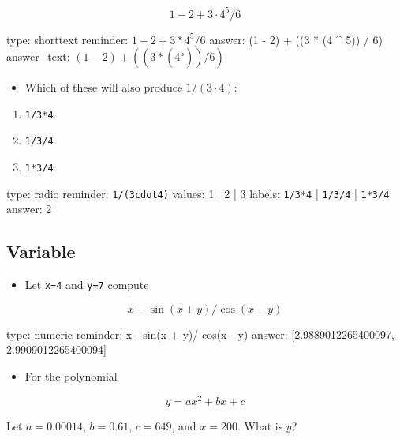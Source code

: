 \documentclass[12pt]{article}
\begin{document}
\[
1 - 2 + 3 \cdot 4 ^ 5 / 6
\]

\begin{answer}
type: shorttext
reminder: \( 1 - 2 + 3 * 4 ^ 5 / 6 \)
answer: (1 - 2) + ((3 * (4 ^ 5)) / 6)
answer_text: \( (1 - 2) + ((3 * (4 ^ 5)) / 6) \) 
\end{answer}

\begin{itemize}
\itemsep1pt\parskip0pt
\item
  Which of these will also produce $1/(3\cdot4)$:
\end{itemize}

\begin{enumerate}
\def\labelenumi{\arabic{enumi})}
\itemsep1pt\parskip0pt
\item
  \texttt{1/3*4}
\item
  \texttt{1/3/4}
\item
  \texttt{1*3/4}
\end{enumerate}

\begin{answer}
type: radio
reminder: \verb+1/(3cdot4)+
values: 1 | 2 | 3
labels: \verb+1/3*4+ | \verb+1/3/4+ | \verb+1*3/4+
answer: 2
\end{answer}

\subsection{Variable}

\begin{itemize}
\itemsep1pt\parskip0pt
\item
  Let \texttt{x=4} and \texttt{y=7} compute
\end{itemize}

\[
x - \sin(x + y)/\cos(x - y)
\]

\begin{answer}
    type: numeric
    reminder: x - sin(x + y)/ cos(x - y)
    answer: [2.9889012265400097, 2.9909012265400094]

\end{answer}

\begin{itemize}
\itemsep1pt\parskip0pt
\item
  For the polynomial
\end{itemize}

\[
y = ax^2 + bx + c
\]

Let $a=0.00014$, $b=0.61$, $c=649$, and $x=200$. What is $y$?
\end{document}
